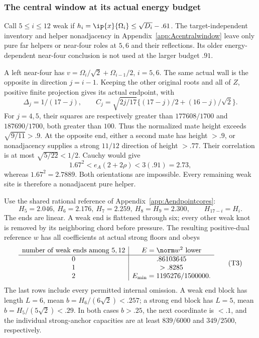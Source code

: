 \subsubsection{The central window at its actual energy budget}
Call \(5\le i\le12\) weak if
\(h_i=\ip{x}{\Omega_i}\le\sqrt{D_i}-.61\).
The target-independent inventory and helper nonadjacency in
Appendix~\ref{app:Acentralwindow} leave only pure far helpers or
near-four roles at \(5,6\) and their reflections.
Its older energy-dependent near-four conclusion is not used at the
larger budget \(.91\).

A left near-four has
\(v=\Omega_i/\sqrt2+\Omega_{i-1}/2\), \(i=5,6\).
The same actual wall is the opposite in direction \(j=i-1\).
Keeping the other original roots and all of \(Z\), positive finite
projection gives its actual endpoint, with
\[
 \Delta_j=1/(17-j),\qquad
 C_j=\sqrt{2j/17}\{(17-j)/2+(16-j)/\sqrt2\}.
\]
For \(j=4,5\), their squares are respectively greater than
\(177608/1700\) and \(187690/1700\), both greater than \(100\).
Thus the normalized mate height exceeds \(\sqrt{9/11}>.9\).
At the opposite end, either a second mate has height \(>.9\), or
nonadjacency supplies a strong \(11/12\) direction of height \(>.77\).
Their correlation is at most \(\sqrt{5/22}<1/2\).
Cauchy would give
\[
 1.67^2<e_A(2+2\rho)<3(.91)=2.73,
\]
whereas \(1.67^2=2.7889\).  Both orientations are impossible.
Every remaining weak site is therefore a nonadjacent pure helper.

Use the shared rational reference of Appendix~\ref{app:Aendpointcores}:
\[
 H_5=2.046,\ H_6=2.176,\ H_7=2.259,\ H_8=H_9=2.300,
 \qquad H_{17-i}=H_i.
\]
The ends are linear.  A weak end is flattened through six; every
other weak knot is removed by its neighboring chord before pressure.
The resulting positive-dual reference \(w\) has all coefficients at
actual strong floors and obeys
\[
\begin{array}{c|c}
 \text{number of weak ends among }5,12&E=\norm w^2\text{ lower}\\ \hline
 0&.86103645\\
 1&>.8285\\
 2&E_{\min}=1195276/1500000 .
\end{array}                                                   \tag{T3}
\]
The last rows include every permitted internal omission.
A weak end block has length \(L=6\), mean
\(b=H_6/(6\sqrt2)<.257\); a strong end block has \(L=5\),
mean \(b=H_5/(5\sqrt2)<.29\).  In both cases \(b>.25\),
the next coordinate is \(<.1\), and the individual strong-anchor
capacities are at least \(839/6000\) and \(349/2500\), respectively.

